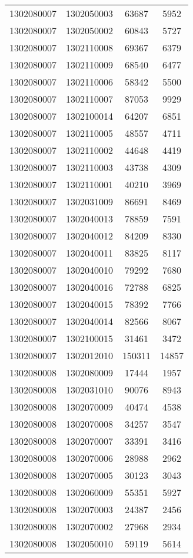 \begin{longtable}[h]{llcc}
		1302080007 & 1302050003 & 63687 & 5952\\
		1302080007 & 1302050002 & 60843 & 5727\\
		1302080007 & 1302110008 & 69367 & 6379\\
		1302080007 & 1302110009 & 68540 & 6477\\
		1302080007 & 1302110006 & 58342 & 5500\\
		1302080007 & 1302110007 & 87053 & 9929\\
		1302080007 & 1302100014 & 64207 & 6851\\
		1302080007 & 1302110005 & 48557 & 4711\\
		1302080007 & 1302110002 & 44648 & 4419\\
		1302080007 & 1302110003 & 43738 & 4309\\
		1302080007 & 1302110001 & 40210 & 3969\\
		1302080007 & 1302031009 & 86691 & 8469\\
		1302080007 & 1302040013 & 78859 & 7591\\
		1302080007 & 1302040012 & 84209 & 8330\\
		1302080007 & 1302040011 & 83825 & 8117\\
		1302080007 & 1302040010 & 79292 & 7680\\
		1302080007 & 1302040016 & 72788 & 6825\\
		1302080007 & 1302040015 & 78392 & 7766\\
		1302080007 & 1302040014 & 82566 & 8067\\
		1302080007 & 1302100015 & 31461 & 3472\\
		1302080007 & 1302012010 & 150311 & 14857\\
		1302080008 & 1302080009 & 17444 & 1957\\
		1302080008 & 1302031010 & 90076 & 8943\\
		1302080008 & 1302070009 & 40474 & 4538\\
		1302080008 & 1302070008 & 34257 & 3547\\
		1302080008 & 1302070007 & 33391 & 3416\\
		1302080008 & 1302070006 & 28988 & 2962\\
		1302080008 & 1302070005 & 30123 & 3043\\
		1302080008 & 1302060009 & 55351 & 5927\\
		1302080008 & 1302070003 & 24387 & 2456\\
		1302080008 & 1302070002 & 27968 & 2934\\
		1302080008 & 1302050010 & 59119 & 5614\\

\end{longtable}
